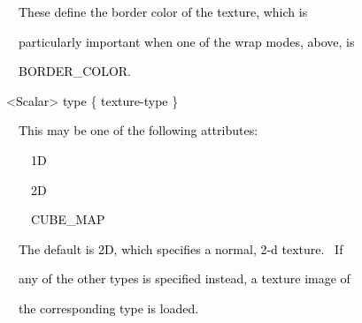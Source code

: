 \documentclass[a4paper]{article}
\newcommand\textstyleOOoComputerKeyWord[1]{\textrm{\textcolor[rgb]{0.0,0.0,0.5019608}{#1}}}
\newcommand\textstyleOOoAssemblerSpecialChar[1]{\textrm{\textcolor[rgb]{0.0,0.5019608,0.0}{#1}}}
\newcommand\textstyleOOoAssemblerIdent[1]{\textrm{\textcolor{black}{#1}}}
\begin{document}
\bigskip

{\color{black}
\textstyleOOoComputerKeyWord{\textcolor{black}{\ \ \ \ These define the {\textquotedbl}border color{\textquotedbl} of
the texture, which is}}}

{\color{black}
\textstyleOOoComputerKeyWord{\textcolor{black}{\ \ \ \ particularly important when one of the wrap modes, above, is}}}

{\color{black}
\textstyleOOoComputerKeyWord{\textcolor{black}{\ \ \ \ BORDER\_COLOR.}}}


\bigskip

{\color{black}
\textstyleOOoComputerKeyWord{\textcolor{black}{\ \ }}\textstyleOOoAssemblerSpecialChar{{\textless}}\textstyleOOoAssemblerIdent{Scalar}\textstyleOOoAssemblerSpecialChar{{\textgreater}}\textstyleOOoComputerKeyWord{\textcolor{black}{
}}\textstyleOOoAssemblerIdent{type}\textstyleOOoComputerKeyWord{\textcolor{black}{
}}\textstyleOOoAssemblerSpecialChar{\{}\textstyleOOoComputerKeyWord{\textcolor{black}{
}}\textstyleOOoAssemblerIdent{texture}\textstyleOOoAssemblerSpecialChar{{}-}\textstyleOOoAssemblerIdent{type}\textstyleOOoComputerKeyWord{\textcolor{black}{
}}\textstyleOOoAssemblerSpecialChar{\}}}


\bigskip

{\color{black}
\textstyleOOoComputerKeyWord{\textcolor{black}{\ \ \ \ This may be one of the following attributes:}}}


\bigskip

{\color{black}
\textstyleOOoComputerKeyWord{\textcolor{black}{\ \ \ \ \ \ 1D}}}

{\color{black}
\textstyleOOoComputerKeyWord{\textcolor{black}{\ \ \ \ \ \ 2D}}}

\clearpage{\color{black}
\textstyleOOoComputerKeyWord{\textcolor{black}{\ \ \ \ \ \ 3D}}}

{\color{black}
\textstyleOOoComputerKeyWord{\textcolor{black}{\ \ \ \ \ \ CUBE\_MAP}}}


\bigskip

{\color{black}
\textstyleOOoComputerKeyWord{\textcolor{black}{\ \ \ \ The default is {\textquotedbl}2D{\textquotedbl}, which specifies
a normal, 2-d texture. \ If}}}

{\color{black}
\textstyleOOoComputerKeyWord{\textcolor{black}{\ \ \ \ any of the other types is specified instead, a texture image
of}}}

{\color{black}
\textstyleOOoComputerKeyWord{\textcolor{black}{\ \ \ \ the corresponding type is loaded.}}}
\end{document}
